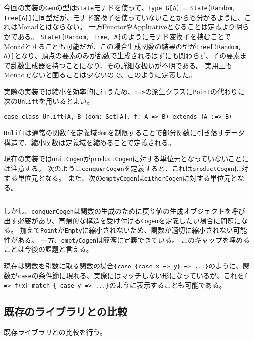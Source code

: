 \documentclass[submit,PRO,onecolumn]{ipsj}
\theoremstyle{definition}
\begin{document}
今回の実装の\texttt{Gen}の型は\texttt{State}モナドを使って、\texttt{type G[A] = State[Random, Tree[A]]}に同型だが、モナド変換子を使っていないことからも分かるように、これはMonadとはならない。
一方FunctorやApplicativeとなることは定義より明らかである。
\texttt{StateT[Random, Tree, A]}のようにモナド変換子を挟むことでMonadとすることも可能だが、この場合生成関数の結果の型が\texttt{Tree[(Random, A)]}となり、頂点の要素のみが乱数で生成されるはずにも関わらず、子の要素まで乱数生成器を持つことになり、その詳細な扱いが不明である。
実用上もMonadでないと困ることは少ないので、このように定義した。

実際の実装では縮小を効率的に行うため、\texttt{:=>}の派生クラスに\texttt{Point}の代わりに次の\texttt{Unlift}を用いるとよい。

\begin{verbatim}
case class Unlift[A, B](dom: Set[A], f: A => B) extends (A :=> B)
\end{verbatim}

\texttt{Unlift}は通常の関数\texttt{f}を定義域\texttt{dom}を制限することで部分関数に引き落すデータ構造で、縮小関数は定義域を縮めることで定義される。

現在の実装では\texttt{unitCogen}が\texttt{productCogen}に対する単位元となっていないことには注意する。
次のように\texttt{conquerCogen}を定義すると、これは\texttt{productCogen}に対する単位元となる。
また、次の\texttt{emptyCogen}は\texttt{eitherCogen}に対する単位元となる。

\inputminted[breaklines,firstline=184,lastline=187]{scala}{../src/main/scala/minicheck.scala}

しかし、\texttt{conquerCogen}は関数の生成のために戻り値の生成オブジェクトを呼び出す必要があり、再帰的な構造を受け付ける\texttt{Cogen}を定義したい場合に問題になる。
加えて\texttt{Point}が\texttt{Empty}に縮小されないため、関数が適切に縮小されない可能性がある。
一方、\texttt{emptyCogen}は簡潔に定義できている。
このギャップを埋めることは今後の課題と言える。

現在は関数を引数に取る関数の場合\texttt{\{case \{case x => y\} => ...\}}のように、関数が\texttt{case}の条件節に現れる、実際にはマッチしない形になっているが、これを\texttt{f => f(x) match \{ case y => ...\}}のように表示することも可能である。

\subsection{既存のライブラリとの比較}

既存ライブラリとの比較を行う。
\end{document}
